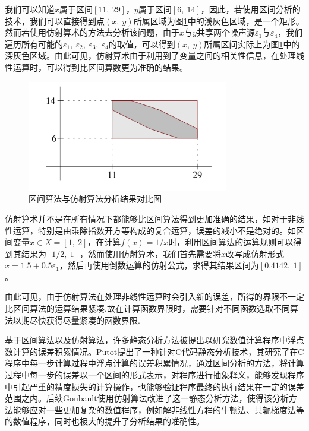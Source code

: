 我们可以知道$x$属于区间$[11,\ 29]$，$y$属于区间$[6,\ 14]$，因此，若使用区间分析的技术，我们可以直接得到点$(x,\ y)$所属区域为图\ref{fig:interval_affine_diff}中的浅灰色区域，是一个矩形。然而若使用仿射算术的方法去分析该问题，由于$x$与$y$共享两个噪声源$\varepsilon_1$与$\varepsilon_4$，我们遍历所有可能的$\varepsilon_1,\ \varepsilon_2,\ \varepsilon_3,\ \varepsilon_4$的取值，可以得到$(x,\ y)$所属区间实际上为图\ref{fig:interval_affine_diff}中的深灰色区域。由此可见，仿射算术由于利用到了变量之间的相关性信息，在处理线性运算时，可以得到比区间算数更为准确的结果。

\begin{figure}[thbp]
    \centering
    \includegraphics[width=88mm]{fig/IntervalAffineDiff.png}
    \caption{区间算法与仿射算法分析结果对比图} \label{fig:interval_affine_diff}
\end{figure}

仿射算术并不是在所有情况下都能够比区间算法得到更加准确的结果，如对于非线性运算，特别是由乘除指数开方等构成的复合运算，误差的减小不是绝对的。如区间变量$x \in X = [1,\ 2]$，在计算$f(x) = 1/x$时，利用区间算法的运算规则可以得到其结果为$[1/2 ,\ 1]$，然而使用仿射算术，我们首先需要将$x$改写成仿射形式$\hat{x} = 1.5 + 0.5\varepsilon_1$，然后再使用倒数运算的仿射公式，求得其结果区间为$[0.4142,\ 1]$。

由此可见，由于仿射算法在处理非线性运算时会引入新的误差，所得的界限不一定比区间算法的运算结果紧凑.故在计算函数界限时，需要针对不同函数选取不同算法以期尽快获得尽量紧凑的函数界限.

基于区间算法以及仿射算法，许多静态分析方法被提出以研究数值计算程序中浮点数计算的误差积累情况。Putot\cite{10.1007/978-3-540-24738-8_18}提出了一种针对C代码静态分析技术，其研究了在C程序中每一步计算过程中浮点计算的误差积累情况，通过区间分析的方法，将计算过程中每一步的误差以一个区间的形式表示，对程序进行抽象释义\cite{cousot1977abstract}，能够发现程序中引起严重的精度损失的计算操作，也能够验证程序最终的执行结果在一定的误差范围之内。后续Goubault\cite{10.1007/3-540-47764-0_14}使用仿射算法改进了这一静态分析方法，使得该分析方法能够应对一些更加复杂的数值程序，例如解非线性方程的牛顿法\cite{atkinson2008introduction}、共轭梯度法\cite{straeter1971extension}等的数值程序，同时也极大的提升了分析结果的准确性。


